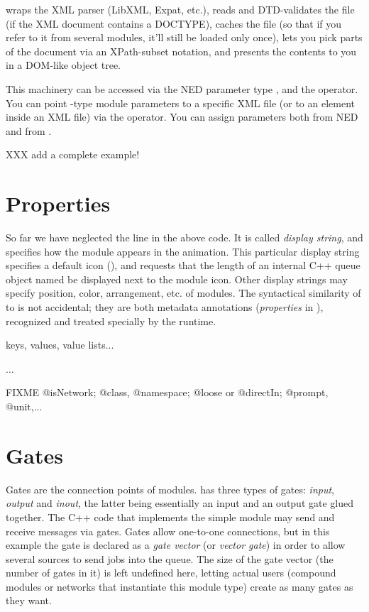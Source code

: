 {\opp} wraps the XML parser (LibXML, Expat, etc.), reads and DTD-validates
the file (if the XML document contains a DOCTYPE), caches the file
(so that if you refer to it from several modules, it'll still be loaded
only once), lets you pick parts of the document via an XPath-subset notation,
and presents the contents to you in a DOM-like object tree.

This machinery can be accessed via the NED parameter type , and the
 operator. You can point -type module parameters
to a specific XML file (or to an element inside an XML file) via the
 operator. You can assign  parameters both from NED
and from .

XXX add a complete example!


\section{Properties}

So far we have neglected the  line in the above code. It is called
\textit{display string}, and specifies how the module appears in the animation.
This particular display string specifies a default icon
(), and requests that the length of an internal C++ queue
object named  be displayed next to the module icon. Other display
strings may specify position, color, arrangement, etc. of modules. The
syntactical similarity of  to  is not accidental; they
are both metadata annotations (\textit{properties} in \opp), recognized and
treated specially by the runtime.

keys, values, value lists...

...

FIXME @isNetwork; @class, @namespace; @loose or @directIn; @prompt, @unit,...


\section{Gates}


Gates are the connection points of modules. {\opp} has three types of gates:
\textit{input}, \textit{output} and \textit{inout}, the latter being essentially
an input and an output gate glued together. The C++ code that implements the
simple module may send and receive messages via gates. Gates allow one-to-one
connections, but in this example the  gate is declared as a \textit{gate
vector} (or \textit{vector gate}) in order to allow several sources to send jobs
into the queue. The size of the gate vector (the number of gates in it) is left
undefined here, letting actual users (compound modules or networks that
instantiate this module type) create as many gates as they want.

